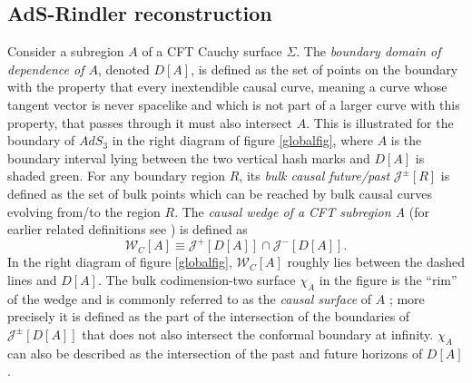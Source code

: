 \documentclass[12pt]{article}
\newcommand{\be}{\begin{equation}}
\newcommand{\ee}{\end{equation}}
\newcommand{\W}{\mathcal{W}}
\newcommand{\J}{\mathcal{J}}
\begin{document}
\subsection{AdS-Rindler reconstruction}\label{rindsec}
Consider a subregion $A$ of a CFT Cauchy surface $\Sigma$.  The \textit{boundary domain of dependence of $A$}, denoted $D[A]$, is defined as the set of points on the boundary with the property that every inextendible causal curve, meaning a curve whose tangent vector is never spacelike and which is not part of a larger curve with this property, that passes through it must also intersect $A$.  This is illustrated for the boundary of $AdS_3$ in the right diagram of figure \ref{globalfig}, where $A$ is the boundary interval lying between the two vertical hash marks and $D[A]$ is shaded green.  For any boundary region $R$, its \textit{bulk causal future/past} $\J^{\pm}[R]$ is defined as the set of bulk points which can be reached by bulk causal curves evolving from/to the region $R$.  The \textit{causal wedge of a CFT subregion A} \cite{Hubeny:2012wa} (for earlier related definitions see \cite{Bousso:2001cf}) is defined as
\be
\W_C[A]\equiv \J^+[D[A]]\cap\J^{-}[D[A]].
\ee
In the right diagram of figure \ref{globalfig}, $\W_C[A]$ roughly lies between the dashed lines and $D[A]$. The bulk codimension-two surface $\chi_A$ in the figure is the ``rim'' of the wedge and is commonly referred to as the \emph{causal surface} of $A$ \cite{Hubeny:2012wa}; more precisely it is defined as the part of the intersection of the boundaries of $\J^\pm[D[A]]$ that does not also intersect the conformal boundary at infinity.  $\chi_A$ can also be described as the intersection of the past and future horizons of $D[A]$.
\end{document}
